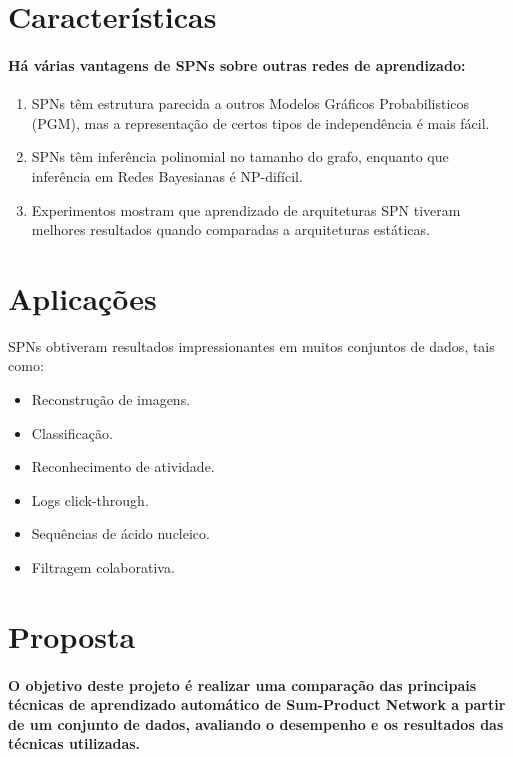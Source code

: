 \documentclass[a4paper,10pt]{article}
\theoremstyle{plain}
\begin{document}
\section{Características}

\paragraph{
  Há várias vantagens de SPNs sobre outras redes de aprendizado:
}

\begin{enumerate} \itemsep0pt
  \item SPNs têm estrutura parecida a outros Modelos Gráficos Probabilisticos (PGM), mas a 
    representação de certos tipos de independência é mais fácil.
  \item SPNs têm inferência polinomial no tamanho do grafo, enquanto que inferência em Redes Bayesianas
    é NP-difícil.
  \item Experimentos mostram que aprendizado de arquiteturas SPN tiveram melhores resultados quando
    comparadas a arquiteturas estáticas.\cite{clustering}
\end{enumerate}

\section{Aplicações}

SPNs obtiveram resultados impressionantes em muitos conjuntos de dados\cite{website:spn-uwashington}, tais como:

\begin{itemize} \itemsep0pt
  \item Reconstrução de imagens.
  \item Classificação.
  \item Reconhecimento de atividade.
  \item Logs click-through.
  \item Sequências de ácido nucleico.
  \item Filtragem colaborativa.
\end{itemize}

\section{Proposta}

\paragraph{
  O objetivo deste projeto é realizar uma comparação das principais técnicas de aprendizado 
automático de Sum-Product Network a partir de um conjunto de dados, avaliando o desempenho 
e os resultados das técnicas utilizadas.
}
\end{document}
